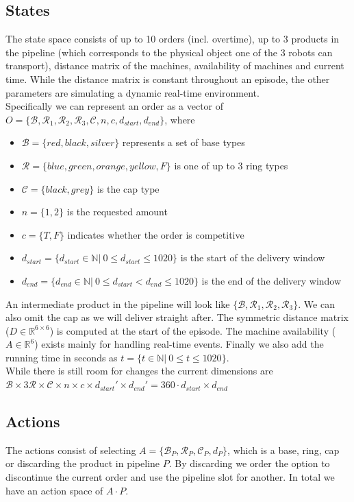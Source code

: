 \documentclass[runningheads,envcountsect]{llncs}
\begin{document}
\subsection{States} \label{states}
The state space consists of up to 10 orders (incl. overtime), up to 3 products in the pipeline (which corresponds to the physical object one of the 3 robots can transport), distance matrix of the machines, availability of machines and current time. While the distance matrix is constant throughout an episode, the other parameters are simulating a dynamic real-time environment.\\
Specifically we can represent an order as a vector of $O=\{\mathcal{B}, \mathcal{R}_1, \mathcal{R}_2, \mathcal{R}_3, \mathcal{C}, n, c, d_{start}, d_{end}  \}$, where
\begin{itemize}
  \item $\mathcal{B}=\{red, black, silver\}$ represents a set of base types
  \item $\mathcal{R}=\{blue, green, orange, yellow, F\}$ is one of up to 3 ring types
  \item $\mathcal{C}=\{black, grey\}$ is the cap type
  \item $n = \{1,2\}$ is the requested amount
  \item $c = \{T, F\}$ indicates whether the order is competitive
  \item $d_{start} = \{d_{start} \in \mathbb{N}|\ 0 \leq d_{start} \leq 1020 \}$ is the start of the delivery window
  \item $d_{end} = \{d_{end} \in \mathbb{N}|\ 0 \leq d_{start} < d_{end} \leq 1020 \}$ is the end of the delivery window
\end{itemize}
An intermediate product in the pipeline will look like $\{\mathcal{B}, \mathcal{R}_1, \mathcal{R}_2, \mathcal{R}_3\}$. We can also omit the cap as we will deliver straight after.
The symmetric distance matrix ($D \in \mathbb{R}^{6 \times 6}$) is computed at the start of the episode. 
The machine availability ($A \in \mathbb{R}^{6}$) exists mainly for handling real-time events.
Finally we also add the running time in seconds as $t = \{t \in \mathbb{N}|\ 0 \leq t \leq 1020 \}$.\\

While there is still room for changes the current dimensions are $\mathcal{B} \times 3\mathcal{R} \times \mathcal{C} \times n \times c \times d_{start}' \times d_{end}' = 360 \cdot d_{start} \times d_{end}$


\subsection{Actions}
The actions consist of selecting $A=\{\mathcal{B}_P, \mathcal{R}_P, \mathcal{C}_P, d_P\}$, which is a base, ring, cap or discarding the product in pipeline $P$. By discarding we order the option to discontinue the current order and use the pipeline slot for another. In total we have an action space of $A\cdot P$.
\end{document}
